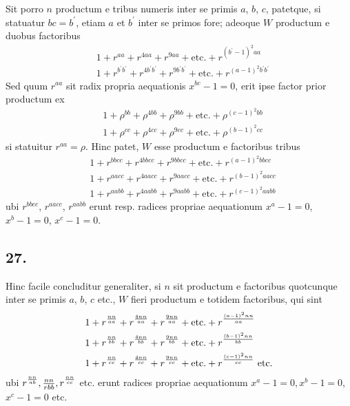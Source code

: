 \documentclass[twoside,12pt]{memoir}
\let\oldfrac\frac
\def\frac#1#2{\mathchoice{\tfrac{#1}{#2}}{\oldfrac{#1}{#2}}{\genfrac{}{}{}{2}{#1}{#2\mathstrut}}{\genfrac{}{}{}{3}{#1}{#2\mathstrut}}}
\begin{document}
Sit porro \(n\) productum e tribus numeris inter se primis \(a\), \(b\), \(c\), patetque, si statuatur \(b c=b^{\prime}\), etiam \(a\) et \(b^{\prime}\) inter se primos fore; adeoque \(W\) productum e duobus factoribus
\[\begin{aligned}
& 1+r^{a a}+r^{4 a a}+r^{9 a a}+\text{etc.}+r^{(b^{\prime}-1)^{2} a a} \\
& 1+r^{b^{\prime} b^{\prime}}+r^{4 b^{\prime} b^{\prime}}+r^{9 b^{\prime} b^{\prime}}+\text{etc.}+r^{(a-1)^{2} b^{\prime} b^{\prime}}
\end{aligned}\]
Sed quum \(r^{a a}\) sit radix propria aequationis \(x^{b c}-1=0\), erit ipse factor prior productum ex
\[\begin{aligned}
& 1+\rho^{b b}+\rho^{4 b b}+\rho^{9 b b}+\text{etc.}+\rho^{(c-1)^{2} b b} \\
& 1+\rho^{c c}+\rho^{4 c c}+\rho^{9 c c}+\text{etc.}+\rho^{(b-1)^{2} c c}
\end{aligned}\]
si statuitur \(r^{a a}=\rho\). Hinc patet, \(W\) esse productum e factoribus tribus
\[\begin{aligned}
& 1+r^{b b c c}+r^{4 b b c c}+r^{9 b b c c}+\text{etc.}+r^{(a-1)^{2} b b c c} \\
& 1+r^{a a c c}+r^{4 a a c c}+r^{9 a a c c}+\text{etc.}+r^{(b-1)^{2} a a c c} \\
& 1+r^{a a b b}+r^{4 a a b b}+r^{9 a a b b}+\text{etc.}+r^{(c-1)^{2} a a b b}
\end{aligned}\]
ubi \(r^{b b c c}\), \(r^{a a c c}\), \(r^{a a b b}\) erunt resp. radices propriae aequationum \(x^{a}-1=0\), \(x^{b}-1=0\), \(x^{c}-1=0\).

\subsection*{27.}
 
Hinc facile concluditur generaliter, si \(n\) sit productum e factoribus quotcunque inter se primis \(a\), \(b\), \(c\) etc., \(W\) fieri productum e totidem factoribus, qui sint
\[\begin{aligned}
& 1+r^{\frac{n n}{a a}}+r^{\frac{4 n n}{a a}}+r^{\frac{9 n n}{a a}}+\text{etc.}+r^{\frac{(a-1)^{2} n n}{a a}} \\
& 1+r^{\frac{n n}{b b}}+r^{\frac{4 n n}{b b}}+r^{\frac{9 n n}{b b}}+\text{etc.}+r^{\frac{(b-1)^{2} n n}{b b}} \\
& 1+r^{\frac{n n}{c c}}+r^{\frac{4 n n}{c c}}+r^{\frac{9 n n}{c c}}+\text{etc.}+r^{\frac{(c-1)^{2} n n}{c c}} \text{ etc.}
\end{aligned}\]
ubi \(r^{\frac{n n}{a b}}, \frac{n n}{r b b}, r^{\frac{n n}{c c}}\) etc. erunt radices propriae aequationum \(x^{a}-1=0, x^{b}-1=0\), \(x^{c}-1=0\) etc.
\end{document}
